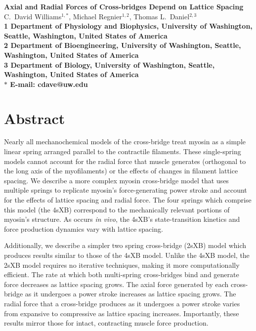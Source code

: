 \documentclass[10pt]{article}
\date{} %
\begin{document}
\begin{flushleft}
{\Large
\textbf{Axial and Radial Forces of Cross-bridges Depend on Lattice Spacing}
}
\\
C.\ David Williams$^{1,\ast}$, 
Michael Regnier$^{1,2}$, 
Thomas L.\ Daniel$^{2,3}$
\\
\bf{1} Department of Physiology and Biophysics, University of Washington, Seattle, Washington, United States of America
\\
\bf{2} Department of Bioengineering, University of Washington, Seattle, Washington, United States of America
\\
\bf{3} Department of Biology, University of Washington, Seattle, Washington, United States of America
\\
$\ast$ E-mail: cdave@uw.edu
\end{flushleft}

\section*{Abstract} %
Nearly all mechanochemical models of the cross-bridge treat myosin as a simple linear spring arranged parallel to the contractile filaments.
These single-spring models cannot account for the radial force that muscle generates (orthogonal to the long axis of the myofilaments) or the effects of changes in filament lattice spacing. 
We describe a more complex myosin cross-bridge model that uses multiple springs to replicate myosin's force-generating power stroke and account for the effects of lattice spacing and radial force. 
The four springs which comprise this model (the 4sXB) correspond to the mechanically relevant portions of myosin's structure.
As occurs \emph{in vivo}, the 4sXB's state-transition kinetics and force production dynamics vary with lattice spacing.

Additionally, we describe a simpler two spring cross-bridge (2sXB) model which produces results similar to those of the 4sXB model.
Unlike the 4sXB model, the 2sXB model requires no iterative techniques, making it more computationally efficient.
The rate at which both multi-spring cross-bridges bind and generate force decreases as lattice spacing grows. 
The axial force generated by each cross-bridge as it undergoes a power stroke increases as lattice spacing grows.
The radial force that a cross-bridge produces as it undergoes a power stroke varies from expansive to compressive as lattice spacing increases.
Importantly, these results mirror those for intact, contracting muscle force production.
\end{document}
